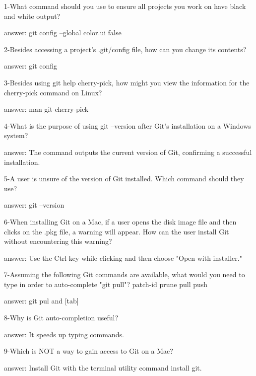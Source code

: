 1-What command should you use to ensure all projects you work on have black and white output?

answer: git config --global color.ui false

2-Besides accessing a project's .git/config file, how can you change its contents?

answer: git config

3-Besides using git help cherry-pick, how might you view the information for the cherry-pick command on Linux?

answer: man git-cherry-pick

4-What is the purpose of using git --version after Git's installation on a Windows system?

answer: The command outputs the current version of Git, confirming a successful installation.

5-A user is unsure of the version of Git installed. Which command should they use?

answer: git --version

6-When installing Git on a Mac, if a user opens the disk image file and then clicks on the .pkg file, a warning will appear. How can the user install Git without encountering this warning?

answer: Use the Ctrl key while clicking and then choose "Open with installer."

7-Assuming the following Git commands are available, what would you need to type in order to auto-complete "git pull"? patch-id
prune
pull
push


answer: git pul and [tab]

8-Why is Git auto-completion useful?

answer: It speeds up typing commands.

9-Which is NOT a way to gain access to Git on a Mac?

answer: Install Git with the terminal utility command install git.

